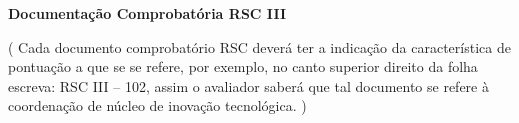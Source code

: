\label{documentacao-probatoria-rsc-iii}

\begin{center}
	\begin{LARGE}
		\textbf{Documentação Comprobatória RSC III}
	\end{LARGE}
\end{center}

\ifcomentarios
\begin{center}
	{\color{red}
		( Cada documento comprobatório RSC deverá ter a indicação da característica de pontuação a que se se refere, por exemplo, no canto superior direito da folha escreva: RSC III – 102, assim o avaliador saberá que tal documento se refere à coordenação de núcleo de inovação tecnológica. )
	}
\end{center}
\fi